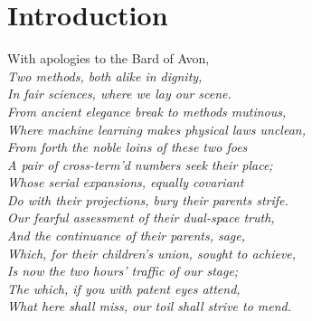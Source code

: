 \section{Introduction}\label{introduction}

With apologies to the Bard of Avon, \\

\vspace{2mm}
\noindent
\textit{Two methods, both alike in dignity, \\
In fair sciences, where we lay our scene. \\
From ancient elegance break to methods mutinous, \\
Where machine learning makes physical laws unclean, \\
From forth the noble loins of these two foes\\
A pair of cross-term'd numbers seek their place;\\
Whose serial expansions, equally covariant\\
Do with their projections, bury their parents strife.\\
Our fearful assessment of their dual-space truth,\\
And the continuance of their parents, sage,\\
Which, for their children's union, sought to achieve,\\
Is now the two hours' traffic of our stage;\\
The which, if you with patent eyes attend,\\
What here shall miss, our toil shall strive to mend.\\}

\vspace{2mm}

